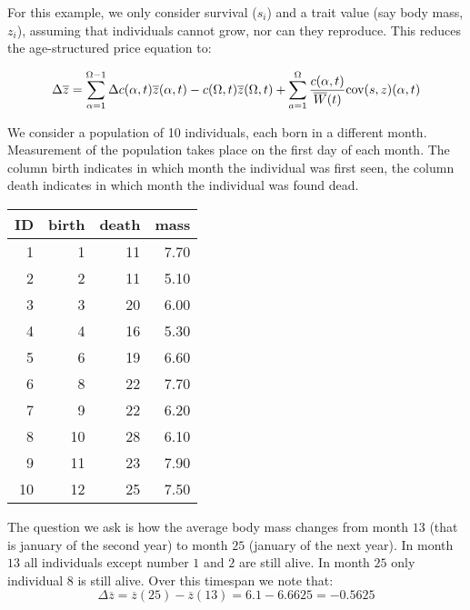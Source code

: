 For this example, we only consider survival ($s_i$) and a trait value (say body mass, $z_i$), assuming that individuals cannot grow, nor can they reproduce. This reduces the age-structured price equation to:

\begin{equation}
\Delta \overline{z} = \sum_{\alpha=1}^{\Omega-1} \Delta c(\alpha,t)\overline{z}(\alpha,t) - c(\Omega,t) \overline{z}(\Omega,t) + \sum_{a=1}^{\Omega} \frac{c(\alpha,t)}{\overline{W}(t)} \text{cov}(s,z)(\alpha,t)
\end{equation}

We consider a population of 10 individuals, each born in a different month. Measurement of the population takes place on the first day of each month. The column birth indicates in which month the individual was first seen, the column death indicates in which month the individual was found dead. \\
\begin{center}
\begin{tabular}{rrrr}
  \hline
ID & birth & death & mass \\ 
  \hline
1 &   1 &  11 & 7.70 \\ 
  2 &   2 &  11 & 5.10 \\ 
  3 &   3 &  20 & 6.00 \\ 
  4 &   4 &  16 & 5.30 \\ 
  5 &   6 &  19 & 6.60 \\ 
  6 &   8 &  22 & 7.70 \\ 
  7 &   9 &  22 & 6.20 \\ 
  8 &  10 &  28 & 6.10 \\ 
  9 &  11 &  23 & 7.90 \\ 
  10 &  12 &  25 & 7.50 \\ 
   \hline
\end{tabular}
\end{center}
The question we ask is how the average body mass changes from month $13$ (that is january of the second year) to month $25$ (january of the next year). In month $13$ all individuals except number $1$ and $2$ are still alive. In month $25$ only individual $8$ is still alive. Over this timespan we note that:
\begin{equation}
\Delta \overline{z} = \overline{z}(25) - \overline{z}(13) = 6.1 - 6.6625 = - 0.5625
\end{equation}

